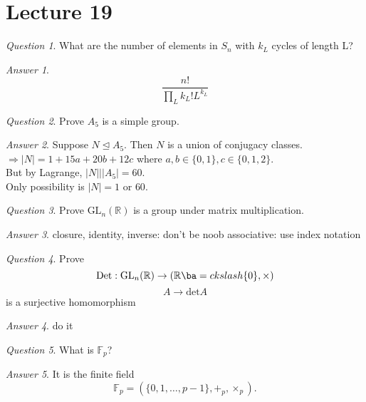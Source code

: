 \documentclass[]{article}
\theoremstyle{remark}
\theoremstyle{qnstyle}
\newtheorem{question}{Question}
\theoremstyle{answerstyle}
\newtheorem*{answer}{Answer}
\begin{document}
\section* {Lecture 19}
{
    \begin{question}
        What are the number of elements in $S_n$ with $k_L$ cycles of length L?
    \end{question}
    \begin{answer}
        $$\frac{n!}{\prod_L{k_L! L^{k_L}}}$$
    \end{answer}
}
{
    \begin{question}
        Prove $A_5$ is a simple group.
    \end{question}
    \begin{answer}
        Suppose $N \trianglelefteq A_5$. Then $N$ is a union of conjugacy classes. \\
        $\Rightarrow |N| = 1 + 15a + 20b + 12c$ where $a,b \in \{0, 1\}, c \in \{0,1,2\}$. \\
        But by Lagrange, $|N| \big \vert |A_5| = 60$.\\
        Only possibility is $|N| = 1$ or $60$.
    \end{answer}
}
{
    \begin{question}
        Prove $\text{GL}_n(\mathbb{R})$ is a group under matrix multiplication.
    \end{question}
    \begin{answer}
        closure, identity, inverse: don't be noob
        associative: use index notation
    \end{answer}
}
{
    \begin{question}
        Prove $$\text{Det}: \text{GL}_n(\mathbb{R}) \to (\mathbb{R} \ba=ckslash \{0\}, \times)$$
            $$A \to \text{det}A$$
        is a surjective homomorphism
    \end{question}
    \begin{answer}
        do it
    \end{answer}
}
{
    \begin{question}
        What is $\mathbb{F}_p$?
    \end{question}
    \begin{answer}
        It is the finite field $$\mathbb{F}_p = (\{0,1,\ldots,p-1\}, +_p, \times_p).$$
    \end{answer}
}
\end{document}

